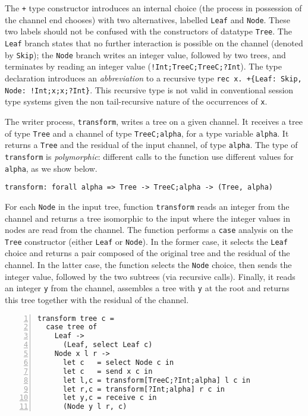 The \lstinline|+| type constructor introduces an internal choice (the
process in possession of the channel end chooses) with two
alternatives, labelled \lstinline|Leaf| and \lstinline|Node|. These
two labels should not be confused with the constructors of datatype
\lstinline|Tree|. The \lstinline|Leaf| branch states that no further
interaction is possible on the channel (denoted by \lstinline|Skip|);
the \lstinline|Node| branch writes an integer value, followed by two
trees, and terminates by reading an integer value
(\lstinline|!Int;TreeC;TreeC;?Int|).
%
The type declaration introduces an \emph{abbreviation} to a recursive
type \lstinline|rec x. +{Leaf: Skip, Node: !Int;x;x;?Int}|.
%
This recursive type is not valid in conventional session type systems
given the non tail-recursive nature of the occurrences of
\lstinline|x|.


The writer process, \lstinline|transform|, writes a tree on a given
channel. It receives a tree of type \lstinline|Tree|  and a channel
of type \lstinline|TreeC;alpha|, for a type variable
\lstinline|alpha|. It returns a \lstinline|Tree| and the residual of
the input channel, of type \lstinline|alpha|. The type of
\lstinline|transform| is \emph{polymorphic}: different calls to the
function use different values for \lstinline|alpha|, as we show below.

\begin{lstlisting}
transform: forall alpha => Tree -> TreeC;alpha -> (Tree, alpha)
\end{lstlisting}

For each \lstinline|Node| in the input tree, function
\lstinline|transform| reads an integer from the channel and returns a
tree isomorphic to the input where the integer values in nodes are
read from the channel.
%
The function performs a \lstinline|case| analysis on the
\lstinline|Tree| constructor (either \lstinline|Leaf| or
\lstinline|Node|). In the former case, it selects the \lstinline|Leaf|
choice and returns a pair composed of the original tree and the
residual of the channel. In the latter case, the function selects the
\lstinline|Node| choice, then sends the integer value, followed by the
two subtrees (via recursive calls). Finally, it reads an integer
\lstinline|y| from the channel, assembles a tree with \lstinline|y| at
the root and returns this tree together with the residual of the
channel.
%
\begin{lstlisting}[numbers=left, xleftmargin=\parindent]
transform tree c =
  case tree of
    Leaf ->
      (Leaf, select Leaf c)
    Node x l r ->
      let c   = select Node c in
      let c   = send x c in
      let l,c = transform[TreeC;?Int;alpha] l c in
      let r,c = transform[?Int;alpha] r c in
      let y,c = receive c in
      (Node y l r, c)
\end{lstlisting}

